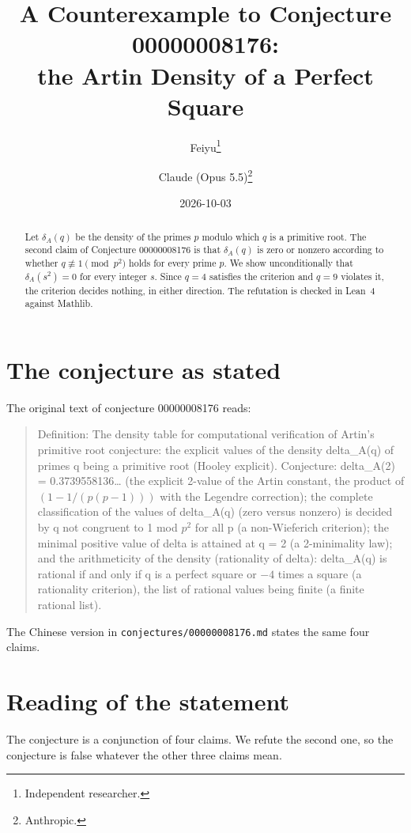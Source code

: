 \documentclass[11pt]{article}
\title{A Counterexample to Conjecture 00000008176:\\
the Artin Density of a Perfect Square}
\author{%
  Feiyu\thanks{Independent researcher.}
  \and
  Claude (Opus 5.5)\thanks{Anthropic.}%
}
\date{2026-10-03}
\theoremstyle{plain}
\theoremstyle{definition}
\theoremstyle{remark}
\begin{document}
\maketitle

\begin{abstract}
Let $\delta_A(q)$ be the density of the primes $p$ modulo which $q$ is a primitive
root. The second claim of Conjecture 00000008176 is that $\delta_A(q)$ is zero or
nonzero according to whether $q\not\equiv1\pmod{p^2}$ holds for every prime $p$. We
show unconditionally that $\delta_A(s^2)=0$ for every integer $s$. Since $q=4$
satisfies the criterion and $q=9$ violates it, the criterion decides nothing, in
either direction. The refutation is checked in Lean~4 against Mathlib.
\end{abstract}

\section{The conjecture as stated}

The original text of conjecture 00000008176 reads:

\begin{quote}
Definition: The density table for computational verification of Artin's primitive
root conjecture: the explicit values of the density delta\_A(q) of primes q being a
primitive root (Hooley explicit). Conjecture: delta\_A(2) = 0.3739558136\dots{} (the
explicit 2-value of the Artin constant, the product of $(1 - 1/(p(p-1)))$ with the
Legendre correction); the complete classification of the values of delta\_A(q) (zero
versus nonzero) is decided by q not congruent to 1 mod $p^2$ for all p (a
non-Wieferich criterion); the minimal positive value of delta is attained at q = 2 (a
2-minimality law); and the arithmeticity of the density (rationality of delta):
delta\_A(q) is rational if and only if q is a perfect square or $-4$ times a square (a
rationality criterion), the list of rational values being finite (a finite rational
list).
\end{quote}

The Chinese version in \texttt{conjectures/00000008176.md} states the same four
claims.

\section{Reading of the statement}

The conjecture is a conjunction of four claims. We refute the second one, so the
conjecture is false whatever the other three claims mean.
\end{document}
